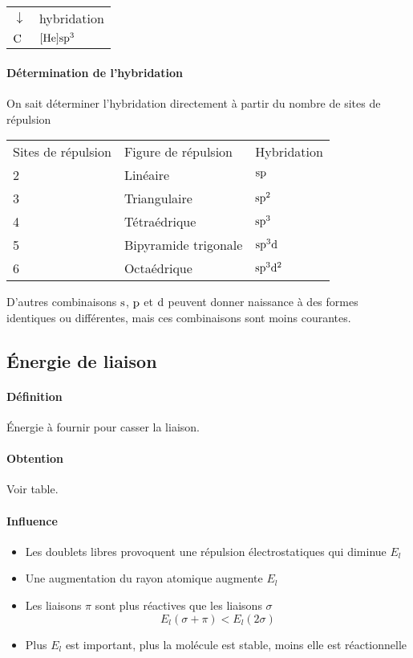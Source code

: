 \documentclass[11pt,a4paper,french]{article}
\begin{document}
\begin{center}
	\begin{tabular}{ll}
		$\downarrow$ &  hybridation\\
		$\ce{C}$ & $[\ce{He}]\sorb\porb^3$
	\end{tabular}
\end{center}

\paragraph{Détermination de l'hybridation}
On sait déterminer l'hybridation directement à partir du nombre de sites de répulsion

\begin{center}
	\begin{tabular}{lll}
		Sites de répulsion & Figure de répulsion & Hybridation\\
		2 & Linéaire & $\mathrm{s}\mathrm{p}$\\
		3 & Triangulaire & $\mathrm{s}\mathrm{p}^2$\\
		4 & Tétraédrique & $\mathrm{s}\mathrm{p}^3$\\
		5 & Bipyramide trigonale & $\mathrm{s}\mathrm{p}^3\mathrm{d}$\\
		6 & Octaédrique & $\mathrm{s}\mathrm{p}^3\mathrm{d}^2$\\
	\end{tabular}
\end{center}

D'autres combinaisons $\mathrm{s}$, $\mathrm{p}$ et $\mathrm{d}$ peuvent donner naissance à des formes identiques ou différentes, mais ces combinaisons sont moins courantes.

\subsection{\'Energie de liaison}
\label{sec:E_l}

\paragraph{Définition}
\'Energie à fournir pour casser la liaison.

\paragraph{Obtention}
Voir table.

\paragraph{Influence}
\begin{itemize}
	\item Les doublets libres provoquent une répulsion électrostatiques qui diminue $E_l$
	\item Une augmentation du rayon atomique augmente $E_l$
	\item Les liaisons $\pi$ sont plus réactives que les liaisons $\sigma$
		\[ E_l(\sigma + \pi) <  E_l(2\sigma) \]
	\item Plus $E_l$ est important, plus la molécule est stable, moins elle est réactionnelle
\end{itemize}
\end{document}
